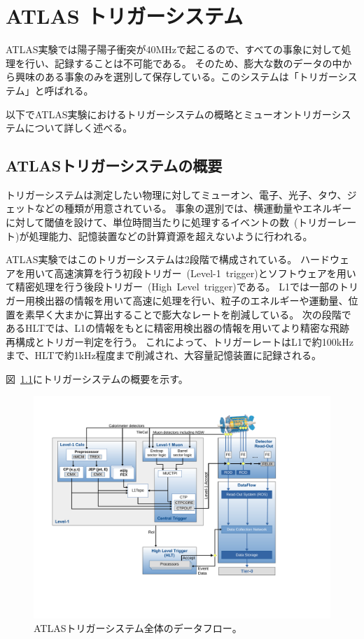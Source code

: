 \chapter{ATLAS トリガーシステム}\label{chapter3}
ATLAS実験では陽子陽子衝突が40MHzで起こるので、すべての事象に対して処理を行い、記録することは不可能である。
そのため、膨大な数のデータの中から興味のある事象のみを選別して保存している。このシステムは「トリガーシステム」と呼ばれる。

以下でATLAS実験におけるトリガーシステムの概略とミューオントリガーシステムについて詳しく述べる。

\section{ATLASトリガーシステムの概要}\label{chapter3-1}
トリガーシステムは測定したい物理に対してミューオン、電子、光子、タウ、ジェットなどの種類が用意されている。
事象の選別では、横運動量やエネルギーに対して閾値を設けて、単位時間当たりに処理するイベントの数~(トリガーレート)が処理能力、記憶装置などの計算資源を超えないように行われる。

ATLAS実験ではこのトリガーシステムは2段階で構成されている。
ハードウェアを用いて高速演算を行う初段トリガー~(Level-1~trigger)とソフトウェアを用いて精密処理を行う後段トリガー~(High~Level~trigger)である。
L1では一部のトリガー用検出器の情報を用いて高速に処理を行い、粒子のエネルギーや運動量、位置を素早く大まかに算出することで膨大なレートを削減している。
次の段階であるHLTでは、L1の情報をもとに精密用検出器の情報を用いてより精密な飛跡再構成とトリガー判定を行う。
これによって、トリガーレートはL1で約100kHzまで、HLTで約1kHz程度まで削減され、大容量記憶装置に記録される。

図~\ref{fig:3-1}にトリガーシステムの概要を示す。

\begin{figure}[H]
  \centering
  \includegraphics[clip, width=14cm]{fig/3/tdaq-run3-schematic.pdf}
  \caption{ATLASトリガーシステム全体のデータフロー\cite{article:approvedPlotsDAQ}。}
  \label{fig:3-1}
\end{figure}

